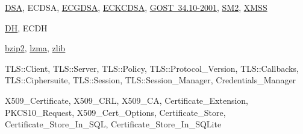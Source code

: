 \begin{DoxyDescription}
\item[Public Key Signature Schemes]\mbox{\hyperlink{dsa_8h_source}{D\+SA}}, E\+C\+D\+SA, \mbox{\hyperlink{ecgdsa_8h_source}{E\+C\+G\+D\+SA}}, \mbox{\hyperlink{eckcdsa_8h_source}{E\+C\+K\+C\+D\+SA}}, \mbox{\hyperlink{gost__3410_8h_source}{G\+O\+ST 34.10-\/2001}}, \mbox{\hyperlink{sm2_8h_source}{S\+M2}}, \mbox{\hyperlink{xmss_8h}{X\+M\+SS}} 
\item[Key Agreement]\mbox{\hyperlink{dh_8h_source}{DH}}, E\+C\+DH 
\item[Compression]\mbox{\hyperlink{bzip2_8h_source}{bzip2}}, \mbox{\hyperlink{lzma_8h_source}{lzma}}, \mbox{\hyperlink{zlib_8h_source}{zlib}} 
\item[T\+LS]T\+L\+S\+::\+Client, T\+L\+S\+::\+Server, T\+L\+S\+::\+Policy, T\+L\+S\+::\+Protocol\+\_\+\+Version, T\+L\+S\+::\+Callbacks, T\+L\+S\+::\+Ciphersuite, T\+L\+S\+::\+Session, T\+L\+S\+::\+Session\+\_\+\+Manager, Credentials\+\_\+\+Manager 
\item[X.\+509]X509\+\_\+\+Certificate, X509\+\_\+\+C\+RL, X509\+\_\+\+CA, Certificate\+\_\+\+Extension, P\+K\+C\+S10\+\_\+\+Request, X509\+\_\+\+Cert\+\_\+\+Options, Certificate\+\_\+\+Store, Certificate\+\_\+\+Store\+\_\+\+In\+\_\+\+S\+QL, Certificate\+\_\+\+Store\+\_\+\+In\+\_\+\+S\+Q\+Lite 
\end{DoxyDescription}